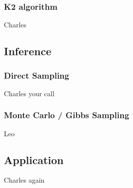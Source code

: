 \documentclass{article}
\begin{document}
\subsubsection{K2 algorithm}
Charles
\subsection{Inference}
\subsubsection{Direct Sampling}
Charles your call
\subsubsection{Monte Carlo / Gibbs Sampling}
Leo
\subsection{Application}
Charles again


\onehalfspacing


\end{document}
